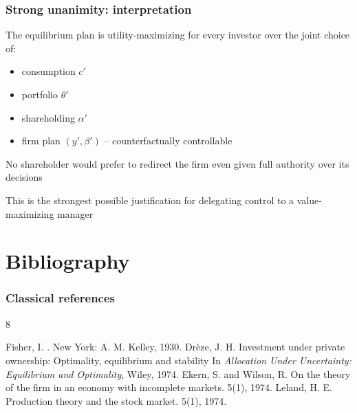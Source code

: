 \documentclass[blue]{beamer}
\theoremstyle{definition}
\theoremstyle{example}
\begin{document}
\begin{frame}\frametitle{Strong unanimity: interpretation}
The equilibrium plan is utility-maximizing for every investor over the joint choice of:
\begin{itemize}
\item consumption $c'$
\item portfolio $\theta'$
\item shareholding $\alpha'$
\item firm plan $(y', \beta')$ -- counterfactually controllable
\end{itemize}
\bigskip

No shareholder would prefer to redirect the firm even given full authority over its decisions
\bigskip

This is the strongest possible justification for delegating control to a value-maximizing manager
\end{frame}

\section{Bibliography}

\begin{frame}\frametitle{Classical references}
\begin{thebibliography}{8}
\begin{small}
  \beamertemplatearticlebibitems
    Fisher, I.
    .
    \newblock New York: A. M. Kelley, 1930.
    Dr\`eze, J. H.
    \newblock Investment under private ownership: Optimality, equilibrium and stability
    \newblock In \emph{Allocation Under Uncertainty: Equilibrium and Optimality}, Wiley, 1974.
    Ekern, S. and Wilson, R.
    \newblock On the theory of the firm in an economy with incomplete markets.
     5(1), 1974.
    Leland, H. E.
    \newblock Production theory and the stock market.
     5(1), 1974.
\end{small}
\end{thebibliography}
\end{frame}
\end{document}
